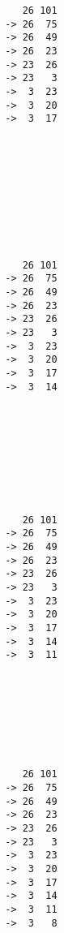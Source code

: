 { \begin{verbatim}
                 26 101
              -> 26  75
              -> 26  49
              -> 26  23
              -> 23  26
              -> 23   3
              ->  3  23
              ->  3  20
              ->  3  17
              
              
              
              
              
              
              
              
              
\end{verbatim}}
{ \begin{verbatim}
                 26 101
              -> 26  75
              -> 26  49
              -> 26  23
              -> 23  26
              -> 23   3
              ->  3  23
              ->  3  20
              ->  3  17
              ->  3  14
              
              
              
              
              
              
              
              
\end{verbatim}}
{ \begin{verbatim}
                 26 101
              -> 26  75
              -> 26  49
              -> 26  23
              -> 23  26
              -> 23   3
              ->  3  23
              ->  3  20
              ->  3  17
              ->  3  14
              ->  3  11
              
              
              
              
              
              
              
\end{verbatim}}
{ \begin{verbatim}
                 26 101
              -> 26  75
              -> 26  49
              -> 26  23
              -> 23  26
              -> 23   3
              ->  3  23
              ->  3  20
              ->  3  17
              ->  3  14
              ->  3  11
              ->  3   8
              
              
              
              
              
              
\end{verbatim}}
